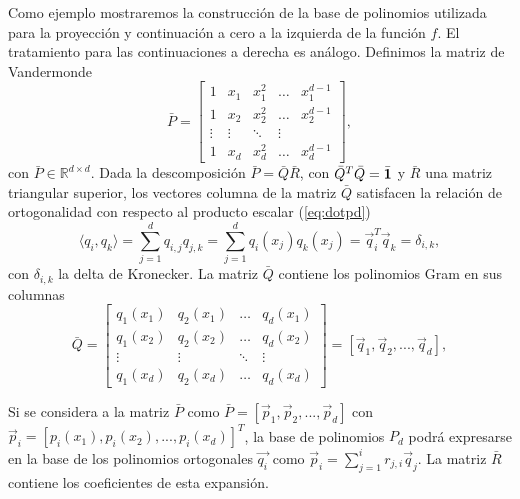 Como ejemplo mostraremos la construcción de la base 
de polinomios utilizada para la proyección y continuación a cero 
a la izquierda de la función $f$. El tratamiento para las continuaciones a derecha 
es análogo. Definimos la matriz de Vandermonde
 \begin{equation}
\bar{P}=
\begin{bmatrix}
    1  & x_{1} & x_{1}^2 & \dots  & x_{1}^{d-1} \\
    1  & x_{2} & x_{2}^2 & \dots  & x_{2}^{d-1} \\
    \vdots  & \vdots & \ddots & \vdots \\
    1 & x_{d} & x_{d}^2 & \dots  & x_{d}^{d-1}
\end{bmatrix},
\label{eq:Vandermonde}
\end{equation}
con $\bar{P}\in\mathbb{R}^{d \times d}$. 
Dada la descomposición $\bar{P}=\bar{Q}\bar{R}$, con $\bar{Q}^T\bar{Q}= \bar{\mathbf{1}}$ y $\bar{R}$ una matriz triangular superior, los vectores columna 
de la matriz $\bar{Q}$ satisfacen la relación de ortogonalidad con respecto al producto escalar 
(\ref{eq:dotpd}) 
\begin{equation*}
\displaystyle \langle q_i,q_k \rangle = \sum_{j=1}^{d}q_{i,j}q_{j,k}=\sum_{j=1}^{d}q_i(x_j)q_k(x_j)=\vec{q}_i^T\vec{q}_k=\delta_{i,k} ,
\end{equation*}
con $\delta_{i,k}$ la delta de 
Kronecker. 
La matriz $\bar{Q}$ contiene los polinomios Gram en sus columnas
\begin{equation}
\bar{Q}=
\begin{bmatrix}
    q_1(x_1) & q_2(x_1) & \dots  & q_{d}(x_1) \\
    q_1(x_2) & q_2(x_2) & \dots  & q_{d}(x_2) \\
    \vdots &  \vdots & \ddots & \vdots \\
    q_1(x_{d}) & q_2(x_{d}) & \dots  &q_{d}(x_{d})
\end{bmatrix}=[\vec{q}_1,\vec{q}_2,...,\vec{q}_{d}],
\label{eq:VandermondeQR}
\end{equation}

Si se considera a la matriz $\bar{P}$ como $\bar{P}=[\vec{p}_1,\vec{p}_2,...,\vec{p}_{d}]$ con $\vec{p}_i=[p_i(x_1),p_i(x_2),...,p_i(x_{d})]^T$, la base de polinomios $P_d$ podrá expresarse en la base de los polinomios ortogonales $\vec{q_i}$ como $\displaystyle \vec{p}_i=\sum_{j=1}^{i}r_{j,i}\vec{q}_j$. La matriz $\bar{R}$ contiene los coeficientes de esta expansión.

